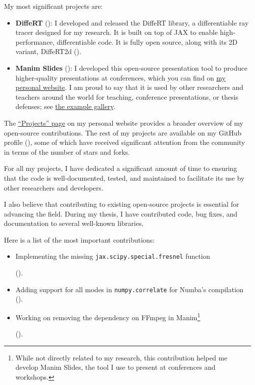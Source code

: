 \begin{refsection}
  My most significant projects are:
  \begin{itemize}
    \item \textbf{DiffeRT} (): I developed and released the DiffeRT library, a differentiable ray tracer designed for my research. It is built on top of JAX to enable high-performance, differentiable code. It is fully open source, along with its 2D variant, DiffeRT2d ().
    \item \textbf{Manim Slides} (): I developed this open-source presentation tool to produce higher-quality presentations at conferences, which you can find on \href{https://eertmans.be/tags/manim-slides/}{my personal website}. I am proud to say that it is used by other researchers and teachers around the world for teaching, conference presentations, or thesis defenses; see \href{https://manim-slides.eertmans.be/latest/gallery.html}{the example gallery}.
  \end{itemize}

  The \href{https://eertmans.be/projects}{\enquote{Projects} page} on my personal website provides a broader overview of my open-source contributions. The rest of my projects are available on my GitHub profile (\GHProfile), some of which have received significant attention from the community in terms of the number of stars and forks.

  For all my projects, I have dedicated a significant amount of time to ensuring that the code is well-documented, tested, and maintained to facilitate its use by other researchers and developers.

  I also believe that contributing to existing open-source projects is essential for advancing the field. During my thesis, I have contributed code, bug fixes, and documentation to several well-known libraries.

  Here is a list of the most important contributions:
  \begin{itemize}
    \item Implementing the missing \texttt{jax.scipy.special.fresnel} function\par ().
    \item Adding support for all modes in \texttt{numpy.correlate} for Numba's  compilation ().
    \item Working on removing the dependency on FFmpeg in Manim\footnote{While not directly related to my research, this contribution helped me develop Manim Slides, the tool I use to present at conferences and workshops.}\par ().
  \end{itemize}


\end{refsection}
